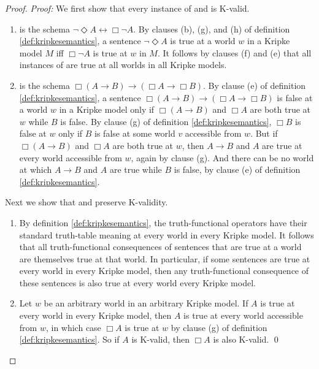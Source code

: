 \begin{proof}
  \emph{Proof:} We first show that every instance of  and  is
  K-valid.
  \begin{enumerate}[leftmargin=7mm]
  \itemsep0mm
  
    \item {} is the schema $\neg\Diamond A \leftrightarrow \Box\neg A$.
          By clauses (b), (g), and (h) of definition \ref{def:kripkesemantics},
          a sentence $\neg\Diamond A$ is true at a world $w$ in a Kripke model
          $M$ iff $\Box\neg A$ is true at $w$ in $M$. It follows by clauses (f)
          and (e) that all instances of  are true at all worlds in all
          Kripke models.
          
    \item {} is the schema $\Box(A \to B) \to (\Box A \to \Box B)$. By
          clause (e) of definition \ref{def:kripkesemantics}, a sentence
          $\Box(A\to B) \to (\Box A \to \Box B)$ is false at a world $w$ in a
          Kripke model only if $\Box(A \to B)$ and $\Box A$ are both true at
          $w$ while $B$ is false. By clause (g) of definition
          \ref{def:kripkesemantics}, $\Box B$ is false at $w$ only if $B$ is
          false at some world $v$ accessible from $w$. But if $\Box(A \to B)$
          and $\Box A$ are both true at $w$, then $A\to B$ and $A$ are true at
          every world accessible from $w$, again by clause (g). And there can be
          no world at which $A\to B$ and $A$ are true while $B$ is false, by
          clause (e) of definition \ref{def:kripkesemantics}.
  \end{enumerate}
  Next we show that  and  preserve K-validity.
  \begin{enumerate}[leftmargin=9mm]
    
    \item By definition \ref{def:kripkesemantics}, the truth-functional
          operators have their standard truth-table meaning at every world in
          every Kripke model. It follows that all truth-functional consequences
          of sentences that are true at a world are themselves true at that
          world. In particular, if some sentences are true at every world in
          every Kripke model, then any truth-functional consequence of these
          sentences is also true at every world every Kripke model.

    \item Let $w$ be an arbitrary world in an arbitrary Kripke model. If $A$ is
          true at every world in every Kripke model, then $A$ is true at every
          world accessible from $w$, in which case $\Box A$ is true at $w$ by
          clause (g) of definition \ref{def:kripkesemantics}. So if $A$ is K-valid, then $\Box A$ is also K-valid. \qed
          
  \end{enumerate}
\end{proof}

